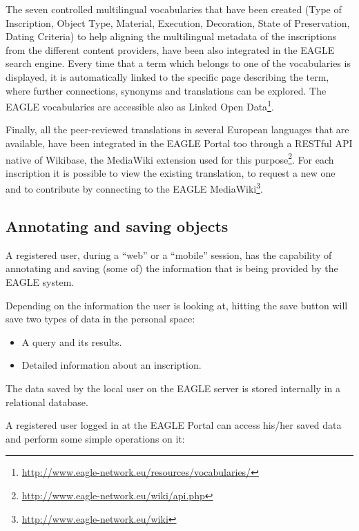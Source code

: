 \documentclass[amsthm,ebook]{saparticle}
\begin{document}
The seven controlled multilingual vocabularies that have been created (Type of Inscription, Object Type, Material,
Execution, Decoration, State of Preservation, Dating Criteria) to help aligning the multilingual metadata of the
inscriptions from the different content providers, have been also integrated in the EAGLE search engine. Every time
that a term which belongs to one of the vocabularies is displayed, it is automatically linked to the specific page
describing the term, where further connections, synonyms and translations can be explored. The EAGLE vocabularies are
accessible also as Linked Open Data\footnote{\url{http://www.eagle-network.eu/resources/vocabularies/}}.

Finally, all the peer-reviewed translations in several European languages that are available, have been integrated in
the EAGLE Portal too through a RESTful API native of Wikibase, the MediaWiki extension used for this purpose\footnote{\url{http://www.eagle-network.eu/wiki/api.php}}. For each inscription it is possible to view the existing translation, to
request a new one and to contribute by connecting to the EAGLE MediaWiki\footnote{\url{http://www.eagle-network.eu/wiki}}.

\subsection{Annotating and saving objects}

A registered user, during a ``web'' or a ``mobile'' session, has the capability of annotating and saving (some of) the
information that is being provided by the EAGLE system.

Depending on the information the user is looking at, hitting the save button will save two types of data in the personal
space: 

\begin{itemize}
\item A query and its results.
\item Detailed information about an inscription.
\end{itemize}
The data saved by the local user on the EAGLE server is stored internally in a relational database.

A registered user logged in at the EAGLE Portal can access his/her saved data and perform some simple operations on it:
\end{document}
